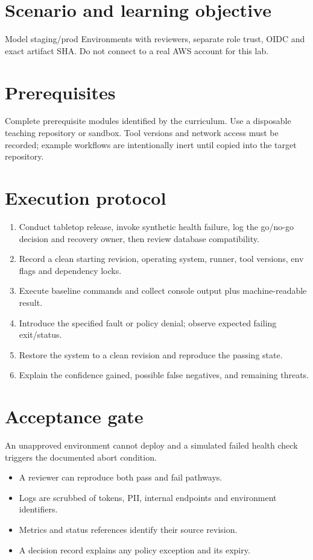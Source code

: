 \documentclass[11pt,letterpaper]{article}
\begin{document}
\makedoctitle
\makedocsummary
\tableofcontents
\clearpage
\section{Scenario and learning objective}
Model staging/prod Environments with reviewers, separate role trust, OIDC and exact artifact SHA. Do not connect to a real AWS account for this lab.

\section{Prerequisites}
Complete prerequisite modules identified by the curriculum. Use a disposable teaching repository or sandbox. Tool versions and network access must be recorded; example workflows are intentionally inert until copied into the target repository.

\section{Execution protocol}
\begin{enumerate}
\item Conduct tabletop release, invoke synthetic health failure, log the go/no-go decision and recovery owner, then review database compatibility.
\item Record a clean starting revision, operating system, runner, tool versions, env flags and dependency locks.
\item Execute baseline commands and collect console output plus machine-readable result.
\item Introduce the specified fault or policy denial; observe expected failing exit/status.
\item Restore the system to a clean revision and reproduce the passing state.
\item Explain the confidence gained, possible false negatives, and remaining threats.
\end{enumerate}
\section{Acceptance gate}
An unapproved environment cannot deploy and a simulated failed health check triggers the documented abort condition.

\begin{itemize}
\item A reviewer can reproduce both pass and fail pathways.
\item Logs are scrubbed of tokens, PII, internal endpoints and environment identifiers.
\item Metrics and status references identify their source revision.
\item A decision record explains any policy exception and its expiry.
\end{itemize}
\end{document}
